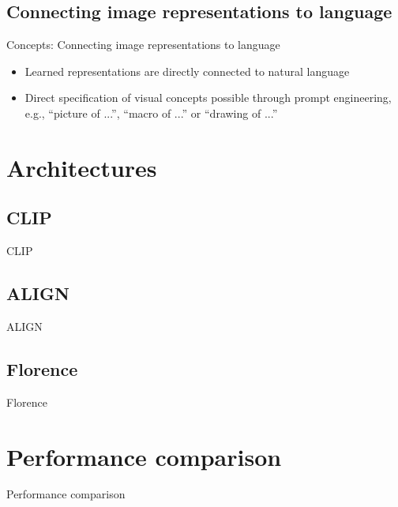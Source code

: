 \documentclass[xcolor=dvipsnames]{beamer}
\begin{document}
\subsection{Connecting image representations to language}
\begin{frame}{Concepts: Connecting image representations to language}
  \begin{itemize}
    \item Learned representations are directly connected to natural language
    \item Direct specification of visual concepts possible through prompt engineering, e.g., \enquote{picture of ...}, \enquote{macro of ...} or \enquote{drawing of ...}
  \end{itemize}
\end{frame}

\section{Architectures} %

\subsection{CLIP}
\begin{frame}{CLIP}
  
\end{frame}


\subsection{ALIGN}
\begin{frame}{ALIGN}
  
\end{frame}

\subsection{Florence}
\begin{frame}{Florence}
  
\end{frame}


\section{Performance comparison} %
\begin{frame}{Performance comparison}
  
\end{frame}
\end{document}

